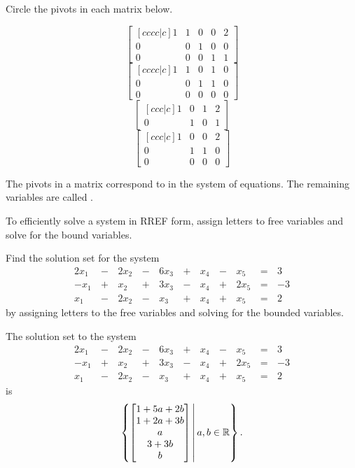 \begin{applicationActivities}
\begin{activity}{5}
Circle the pivots in each matrix below.
\begin{multicols}{2}
\[ \begin{bmatrix}[cccc|c] 1 & 1 & 0 & 0 & 2 \\ 0 & 0 & 1 & 0 &  0 \\ 0 & 0 & 0 &  1 & 1 \end{bmatrix} \]
\[ \begin{bmatrix}[cccc|c] 1 & 1 & 0 & 1 & 0 \\ 0 & 0 & 1 & 1 & 0 \\ 0 & 0 & 0 & 0  & 0 \end{bmatrix} \]
\[ \begin{bmatrix}[ccc|c] 1 & 0 & 1 & 2 \\ 0 & 1 & 0 & 1 \end{bmatrix} \]
\[ \begin{bmatrix}[ccc|c] 1 & 0 & 0 & 2 \\ 0 & 1 & 1 & 0 \\ 0 & 0 & 0 & 0 \end{bmatrix} \]
\end{multicols}
\end{activity}

\begin{definition}
The pivots in a matrix correspond to  in the system of equations.  The remaining variables are called .

To efficiently solve a system in RREF form, assign letters to free variables and solve for the bound variables.
\end{definition}

\begin{activity}{10}
Find the solution set for the system
\begin{alignat*}{6}
2x_1&\,-\,&2x_2&\,-\,&6x_3&\,+\,&x_4&\,-\,&x_5&\,=\,&3 \\
-x_1&\,+\,&x_2&\,+\,&3x_3&\,-\,&x_4&\,+\,&2x_5 &\,=\,& -3 \\
x_1&\,-\,&2x_2&\,-\,&x_3&\,+\,&x_4&\,+\,&x_5 &\,=\,& 2
\end{alignat*}
by assigning letters to the free variables and solving for the bounded variables.
\end{activity}

\begin{observation}
The solution set to the system
\begin{alignat*}{6}
2x_1&\,-\,&2x_2&\,-\,&6x_3&\,+\,&x_4&\,-\,&x_5&\,=\,&3 \\
-x_1&\,+\,&x_2&\,+\,&3x_3&\,-\,&x_4&\,+\,&2x_5 &\,=\,& -3 \\
x_1&\,-\,&2x_2&\,-\,&x_3&\,+\,&x_4&\,+\,&x_5 &\,=\,& 2
\end{alignat*}
is \[\left\{ \begin{bmatrix} 1+5a+2b \\ 1+2a+3b \\ a \\3+3b \\ b \end{bmatrix}\,\middle|\, a,b\in \mathbb{R}\right\}.\]
\end{observation}


\end{applicationActivities}
